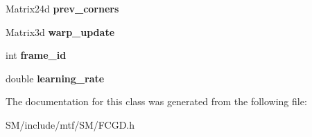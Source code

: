 \begin{DoxyCompactItemize}
\item 
\hypertarget{classFCGD_a29ac79950e25b05a0fb0e40f2226eb04}{Matrix24d {\bfseries prev\-\_\-corners}}\label{classFCGD_a29ac79950e25b05a0fb0e40f2226eb04}

\item 
\hypertarget{classFCGD_a03b1b86d4a6dcb6787600685607b2955}{Matrix3d {\bfseries warp\-\_\-update}}\label{classFCGD_a03b1b86d4a6dcb6787600685607b2955}

\item 
\hypertarget{classFCGD_ae2e89662028e09272088ffe8943e96b1}{int {\bfseries frame\-\_\-id}}\label{classFCGD_ae2e89662028e09272088ffe8943e96b1}

\item 
\hypertarget{classFCGD_a8911d78ab56f334b3a09a19161e29fee}{double {\bfseries learning\-\_\-rate}}\label{classFCGD_a8911d78ab56f334b3a09a19161e29fee}

\end{DoxyCompactItemize}


The documentation for this class was generated from the following file\-:\begin{DoxyCompactItemize}
\item 
S\-M/include/mtf/\-S\-M/F\-C\-G\-D.\-h\end{DoxyCompactItemize}
